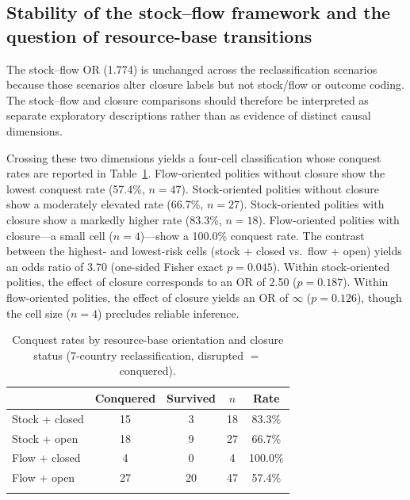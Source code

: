 \documentclass[pdflatex,sn-basic]{sn-jnl}
\theoremstyle{thmstyleone}%
\theoremstyle{thmstyletwo}%
\theoremstyle{thmstylethree}%
\begin{document}
\subsection{Stability of the stock--flow framework and the question of resource-base transitions}\label{sec:disc-stockflow}

The stock--flow OR (1.774) is unchanged across the reclassification scenarios because those scenarios alter closure labels but not stock/flow or outcome coding. The stock--flow and closure comparisons should therefore be interpreted as separate exploratory descriptions rather than as evidence of distinct causal dimensions.

Crossing these two dimensions yields a four-cell classification whose conquest rates are reported in Table~\ref{tab:stockflow-closure}. Flow-oriented polities without closure show the lowest conquest rate (57.4\%, $n = 47$). Stock-oriented polities without closure show a moderately elevated rate (66.7\%, $n = 27$). Stock-oriented polities with closure show a markedly higher rate (83.3\%, $n = 18$). Flow-oriented polities with closure---a small cell ($n = 4$)---show a 100.0\% conquest rate. The contrast between the highest- and lowest-risk cells (stock + closed vs.\ flow + open) yields an odds ratio of 3.70 (one-sided Fisher exact $p = 0.045$). Within stock-oriented polities, the effect of closure corresponds to an OR of 2.50 ($p = 0.187$). Within flow-oriented polities, the effect of closure yields an OR of $\infty$ ($p = 0.126$), though the cell size ($n = 4$) precludes reliable inference.

\begin{table}[htbp]
\caption{Conquest rates by resource-base orientation and closure status (7-country reclassification, disrupted $=$ conquered).}
\label{tab:stockflow-closure}
\begin{tabular*}{\textwidth}{@{\extracolsep\fill}lcccc}
\toprule
 & Conquered & Survived & $n$ & Rate \\
\midrule
Stock + closed & 15 & 3 & 18 & 83.3\% \\
Stock + open & 18 & 9 & 27 & 66.7\% \\
Flow + closed & 4 & 0 & 4 & 100.0\% \\
Flow + open & 27 & 20 & 47 & 57.4\% \\
\botrule
\end{tabular*}
\end{table}
\end{document}
